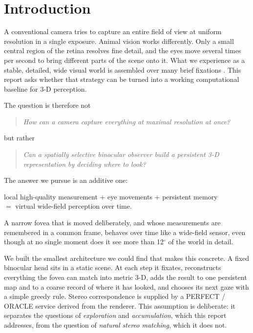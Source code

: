 \documentclass[11pt,a4paper]{article}
\newcommand{\degr}{\ensuremath{^\circ}}
\begin{document}
\section{Introduction}

A conventional camera tries to capture an entire field of view at uniform resolution in a single exposure. Animal
vision works differently. Only a small central region of the retina resolves fine detail, and the eyes move several
times per second to bring different parts of the scene onto it. What we experience as a stable, detailed, wide visual
world is assembled over many brief fixations \citep{yarbus1967}. This report asks whether that strategy can be turned
into a working computational baseline for 3-D perception.

The question is therefore not
\begin{quote}
\itshape How can a camera capture everything at maximal resolution at once?
\end{quote}
but rather
\begin{quote}
\itshape Can a spatially selective binocular observer build a persistent 3-D representation by deciding where to look?
\end{quote}
The answer we pursue is an additive one:
\begin{center}
local high-quality measurement \;$+$\; eye movements \;$+$\; persistent memory\\[2pt]
$=$\; virtual wide-field perception over time.
\end{center}
A narrow fovea that is moved deliberately, and whose measurements are remembered in a common frame, behaves over time
like a wide-field sensor, even though at no single moment does it see more than 12\degr{} of the world in detail.

We built the smallest architecture we could find that makes this concrete. A fixed binocular head sits in a static
scene. At each step it fixates, reconstructs everything the fovea can match into metric 3-D, adds the result to one
persistent map and to a coarse record of where it has looked, and chooses its next gaze with a simple greedy rule.
Stereo correspondence is supplied by a PERFECT / ORACLE service derived from the renderer. This assumption is
deliberate: it separates the questions of \emph{exploration} and \emph{accumulation}, which this report addresses, from
the question of \emph{natural stereo matching}, which it does not.
\end{document}
